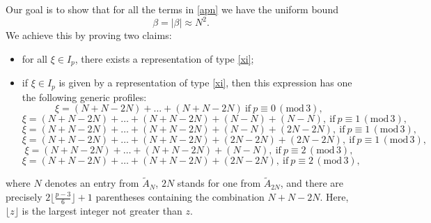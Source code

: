 \documentclass{amsart}
\begin{document}
Our goal is to show that for all the terms in \eqref{apn} we have the uniform bound
\begin{equation}
\beta= |\beta| \approx N^2.
\label{bodd}
\end{equation} 
We achieve this by proving two claims:
\begin{itemize}
\item for all $\xi \in I_p$, there exists a representation of type \eqref{xi};

\item if $\xi \in I_p$ is given by a representation of type \eqref{xi}, then this expression has one the following generic profiles:
\begin{equation}
\xi=(N+N-2N)+\ldots+(N+N-2N) \ \text{if}\ p\equiv 0\, (\text{mod}\,3),
\label{0mod3}
\end{equation}
\begin{equation}
\xi= (N+N-2N)+\ldots+(N+N-2N)+(N-N)+(N-N), \ \text{if}\ p\equiv 1\, (\text{mod}\,3),\label{1mod31}
\end{equation}
\begin{equation}
\xi= (N+N-2N)+\ldots+(N+N-2N)+(N-N)+(2N-2N), \ \text{if}\ p\equiv 1\, (\text{mod}\,3), \label{1mod32}
\end{equation}
\begin{equation}
\xi= (N+N-2N)+\ldots+(N+N-2N)+(2N-2N)+(2N-2N), \ \text{if}\ p\equiv 1\,(\text{mod}\,3), \label{1mod33}
\end{equation}
\begin{equation}
\xi= (N+N-2N)+\ldots+(N+N-2N)+(N-N), \ \text{if}\ p\equiv 2\, (\text{mod}\,3), \label{2mod31}
\end{equation}
\begin{equation}
\xi= (N+N-2N)+\ldots+(N+N-2N)+(2N-2N), \ \text{if}\ p\equiv 2\, (\text{mod}\,3), \label{2mod32}
\end{equation}
\end{itemize}
where $N$ denotes an entry from $\tilde{A}_N$, $2N$ stands for one from $\tilde{A}_{2N}$, and there are precisely $2 \lfloor\frac{p-3}{6}\rfloor +1$ parentheses containing the combination $N+N-2N$. Here, $\lfloor z \rfloor$ is the largest integer not greater than $z$. 
\end{document}
